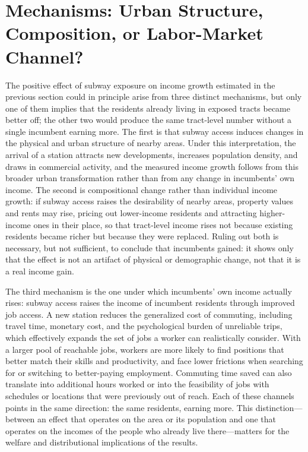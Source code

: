 \section{Mechanisms: Urban Structure, Composition, or Labor-Market Channel?}
\label{s:mechanisms}

The positive effect of subway exposure on income growth estimated in the previous section could in principle arise from three distinct mechanisms, but only one of them implies that the residents already living in exposed tracts became better off; the other two would produce the same tract-level number without a single incumbent earning more. The first is that subway access induces changes in the physical and urban structure of nearby areas. Under this interpretation, the arrival of a station attracts new developments, increases population density, and draws in commercial activity, and the measured income growth follows from this broader urban transformation rather than from any change in incumbents' own income. The second is compositional change rather than individual income growth: if subway access raises the desirability of nearby areas, property values and rents may rise, pricing out lower-income residents and attracting higher-income ones in their place, so that tract-level income rises not because existing residents became richer but because they were replaced. Ruling out both is necessary, but not sufficient, to conclude that incumbents gained: it shows only that the effect is not an artifact of physical or demographic change, not that it is a real income gain.

The third mechanism is the one under which incumbents' own income actually rises: subway access raises the income of incumbent residents through improved job access. A new station reduces the generalized cost of commuting, including travel time, monetary cost, and the psychological burden of unreliable trips, which effectively expands the set of jobs a worker can realistically consider. With a larger pool of reachable jobs, workers are more likely to find positions that better match their skills and productivity, and face lower frictions when searching for or switching to better-paying employment. Commuting time saved can also translate into additional hours worked or into the feasibility of jobs with schedules or locations that were previously out of reach. Each of these channels points in the same direction: the same residents, earning more. This distinction---between an effect that operates on the area or its population and one that operates on the incomes of the people who already live there---matters for the welfare and distributional implications of the results.

